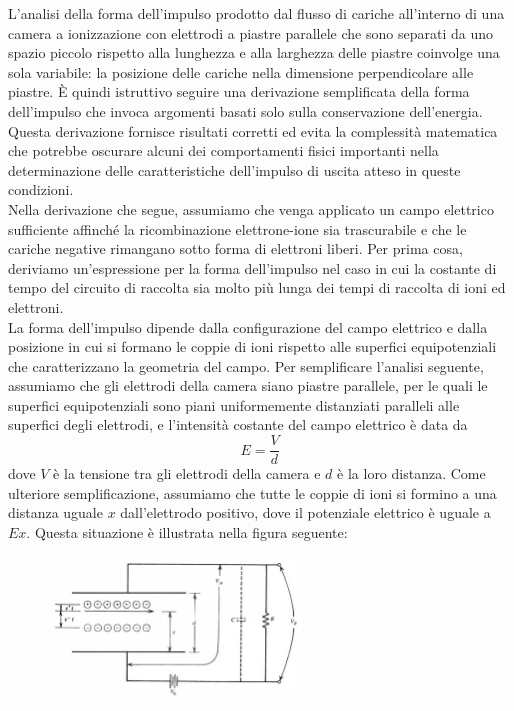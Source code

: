 \begin{approfondimento}
   \vspace{0.2cm}L'analisi della forma dell'impulso prodotto dal flusso di cariche all'interno di una camera a ionizzazione con elettrodi a piastre parallele che sono separati da uno spazio piccolo rispetto alla lunghezza e alla larghezza delle piastre coinvolge una sola variabile: la posizione delle cariche nella dimensione perpendicolare alle piastre. È quindi istruttivo seguire una derivazione semplificata della forma dell'impulso che invoca argomenti basati solo sulla conservazione dell'energia. Questa derivazione fornisce risultati corretti ed evita la complessità matematica che potrebbe oscurare alcuni dei comportamenti fisici importanti nella determinazione delle caratteristiche dell'impulso di uscita atteso in queste condizioni.\\
   Nella derivazione che segue, assumiamo che venga applicato un campo elettrico sufficiente affinché la ricombinazione elettrone-ione sia trascurabile e che le cariche negative rimangano sotto forma di elettroni liberi. Per prima cosa, deriviamo un'espressione per la forma dell'impulso nel caso in cui la costante di tempo del circuito di raccolta sia molto più lunga dei tempi di raccolta di ioni ed elettroni.\\
   La forma dell'impulso dipende dalla configurazione del campo elettrico e dalla posizione in cui si formano le coppie di ioni rispetto alle superfici equipotenziali che caratterizzano la geometria del campo. Per semplificare l'analisi seguente, assumiamo che gli elettrodi della camera siano piastre parallele, per le quali le superfici equipotenziali sono piani uniformemente distanziati paralleli alle superfici degli elettrodi, e l'intensità costante del campo elettrico è data da
   \begin{equation*}
      E=\frac{V}{d}
   \end{equation*}
   dove $V$ è la tensione tra gli elettrodi della camera e $d$ è la loro distanza. Come ulteriore semplificazione, assumiamo che tutte le coppie di ioni si formino a una distanza uguale $x$ dall'elettrodo positivo, dove il potenziale elettrico è uguale a $Ex$. Questa situazione è illustrata nella figura seguente:
   \begin{figure}[H]
      \centering
      \includegraphics[width=0.6\textwidth]{immagini/circuito_forma_segnale.png}

\end{figure}
\end{approfondimento}
